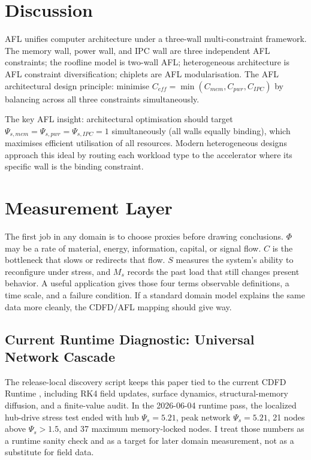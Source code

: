 \documentclass[11pt]{article}
\begin{document}
\section{Discussion}

AFL unifies computer architecture under a three-wall multi-constraint framework. The memory
wall, power wall, and IPC wall are three independent AFL constraints; the roofline model is
two-wall AFL; heterogeneous architecture is AFL constraint diversification; chiplets are AFL
modularisation. The AFL architectural design principle: minimise $C_{eff} = \min(C_{mem},
C_{pwr}, C_{IPC})$ by balancing across all three constraints simultaneously.

The key AFL insight: architectural optimisation should target $\Psi_{s,mem} = \Psi_{s,pwr} =
\Psi_{s,IPC} = 1$ simultaneously (all walls equally binding), which maximises efficient
utilisation of all resources. Modern heterogeneous designs approach this ideal by routing
each workload type to the accelerator where its specific wall is the binding constraint.



\section{Measurement Layer}

The first job in any domain is to choose proxies before drawing conclusions. $\Phi$ may be a rate of material, energy, information, capital, or signal flow. $C$ is the bottleneck that slows or redirects that flow. $S$ measures the system's ability to reconfigure under stress, and $M_s$ records the past load that still changes present behavior. A useful application gives those four terms observable definitions, a time scale, and a failure condition. If a standard domain model explains the same data more cleanly, the CDFD/AFL mapping should give way.

\subsection{Current Runtime Diagnostic: Universal Network Cascade}
The release-local discovery script keeps this paper tied to the current CDFD Runtime \cite{CDFDRuntime2026}, including RK4 field updates, surface dynamics, structural-memory diffusion, and a finite-value audit. In the 2026-06-04 runtime pass, the localized hub-drive stress test ended with hub $\Psi_s=5.21$, peak network $\Psi_s=5.21$, 21 nodes above $\Psi_s>1.5$, and 37 maximum memory-locked nodes. I treat those numbers as a runtime sanity check and as a target for later domain measurement, not as a substitute for field data.
\end{document}
